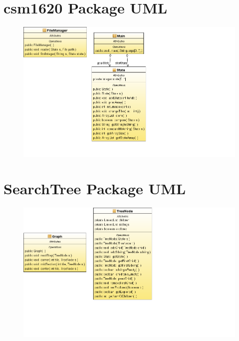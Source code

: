 \documentclass[journal]{IEEEtran}
\begin{document}
\appendices
\newpage
\onecolumn

\section{csm1620 Package UML}\label{csm6120PackageUML}

\begin{figure}[h]
\centering
\includegraphics[width=1.4\textwidth,natwidth=610,natheight=642]{../Model/CSM6120_Assignment2-Model/ClassDiagram1.png} 

\end{figure}

\newpage
\section{SearchTree Package UML}\label{searchTreeUML}
\begin{figure}[h]
\centering
\includegraphics[width=1.4\textwidth,natwidth=610,natheight=642]{../Model/CSM6120_Assignment2-Model/ClassDiagram3.png} 

\end{figure}
\end{document}
